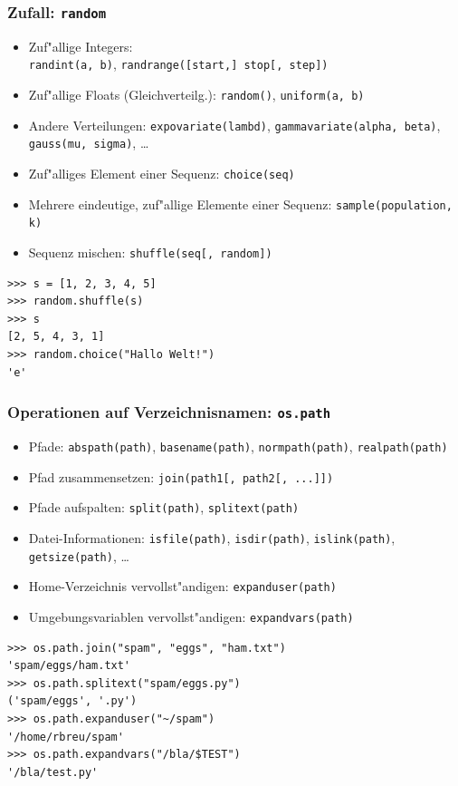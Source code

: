 \begin{frame}[fragile]
\frametitle{Zufall: \texttt{random}}
\begin{itemize}
\item Zuf"allige Integers: \\ \texttt{randint(a, b)},  \texttt{randrange([start,] stop[, step])}
\item Zuf"allige Floats (Gleichverteilg.): \texttt{random()}, \texttt{uniform(a, b)}
\item Andere Verteilungen: \texttt{expovariate(lambd)}, \texttt{gammavariate(alpha, beta)}, \texttt{gauss(mu, sigma)}, \dots
\item Zuf"alliges Element einer Sequenz: \texttt{choice(seq)}
\item Mehrere eindeutige, zuf"allige Elemente einer Sequenz: \texttt{sample(population, k)}
\item Sequenz mischen: \texttt{shuffle(seq[, random])}
\end{itemize}
\begin{lstlisting}[style=Python]
>>> s = [1, 2, 3, 4, 5]
>>> random.shuffle(s)
>>> s
[2, 5, 4, 3, 1]
>>> random.choice("Hallo Welt!")
'e'
\end{lstlisting}
\end{frame}

\begin{frame}[fragile]
\frametitle{Operationen auf Verzeichnisnamen: \texttt{os.path}}
\begin{itemize}
\item Pfade: \texttt{abspath(path)}, \texttt{basename(path)}, \texttt{normpath(path)}, \texttt{realpath(path)}
\item Pfad zusammensetzen: \texttt{join(path1[, path2[, ...]])}
\item Pfade aufspalten: \texttt{split(path)}, \texttt{splitext(path)}
\item Datei-Informationen: \texttt{isfile(path)}, \texttt{isdir(path)}, \texttt{islink(path)}, \texttt{getsize(path)}, \dots
\item Home-Verzeichnis vervollst"andigen: \texttt{expanduser(path)}
\item Umgebungsvariablen vervollst"andigen: \texttt{expandvars(path)}
\end{itemize} 
\begin{lstlisting}[style=Shell]
>>> os.path.join("spam", "eggs", "ham.txt")
'spam/eggs/ham.txt'
>>> os.path.splitext("spam/eggs.py")
('spam/eggs', '.py')
>>> os.path.expanduser("~/spam")
'/home/rbreu/spam'
>>> os.path.expandvars("/bla/$TEST")
'/bla/test.py'
\end{lstlisting}%
\end{frame}

